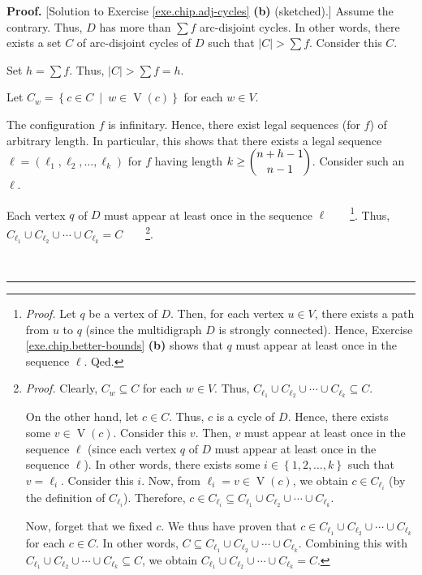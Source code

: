 \documentclass[numbers=enddot,12pt,final,onecolumn,notitlepage]{scrartcl}%
\theoremstyle{definition}
\newenvironment{proof}[1][Proof]{\noindent\textbf{#1.} }{\ \rule{0.5em}{0.5em}}
\let\sumnonlimits\sum
\renewcommand{\sum}{\sumnonlimits\limits}
\begin{document}
\begin{proof}
[Solution to Exercise \ref{exe.chip.adj-cycles} \textbf{(b)} (sketched).]
Assume the contrary. Thus, $D$ has more than $\sum f$ arc-disjoint cycles. In
other words, there exists a set $C$ of arc-disjoint cycles of $D$ such that
$\left\vert C\right\vert >\sum f$. Consider this $C$.

Set $h=\sum f$. Thus, $\left\vert C\right\vert >\sum f=h$.

Let $C_{w}=\left\{  c\in C\ \mid\ w\in\operatorname*{V}\left(  c\right)
\right\}  $ for each $w\in V$.

The configuration $f$ is infinitary. Hence, there exist legal sequences (for
$f$) of arbitrary length. In particular, this shows that there exists a legal
sequence $\ell=\left(  \ell_{1},\ell_{2},\ldots,\ell_{k}\right)  $ for $f$
having length $k\geq\dbinom{n+h-1}{n-1}$. Consider such an $\ell$.

Each vertex $q$ of $D$ must appear  at least once in the sequence $\ell
$\ \ \ \ \footnote{\textit{Proof.} Let $q$ be a vertex of $D$. Then, for each
vertex $u\in V$, there exists a path from $u$ to $q$ (since the multidigraph
$D$ is strongly connected). Hence, Exercise \ref{exe.chip.better-bounds}
\textbf{(b)} shows that $q$ must appear at least once in the sequence $\ell$.
Qed.}. Thus, $C_{\ell_{1}}\cup C_{\ell_{2}}\cup\cdots\cup C_{\ell_{k}}%
=C$\ \ \ \ \footnote{\textit{Proof.} Clearly, $C_{w}\subseteq C$ for each
$w\in V$. Thus, $C_{\ell_{1}}\cup C_{\ell_{2}}\cup\cdots\cup C_{\ell_{k}%
}\subseteq C$.
\par
On the other hand, let $c\in C$. Thus, $c$ is a cycle of $D$. Hence, there
exists some $v\in\operatorname*{V}\left(  c\right)  $. Consider this $v$.
Then, $v$ must appear at least once in the sequence $\ell$ (since each vertex
$q$ of $D$ must appear at least once in the sequence $\ell$). In other words,
there exists some $i\in\left\{  1,2,\ldots,k\right\}  $ such that $v=\ell_{i}%
$. Consider this $i$. Now, from $\ell_{i}=v\in\operatorname*{V}\left(
c\right)  $, we obtain $c\in C_{\ell_{i}}$ (by the definition of $C_{\ell_{i}%
}$). Therefore, $c\in C_{\ell_{i}}\subseteq C_{\ell_{1}}\cup C_{\ell_{2}}%
\cup\cdots\cup C_{\ell_{k}}$.
\par
Now, forget that we fixed $c$. We thus have proven that $c\in C_{\ell_{1}}\cup
C_{\ell_{2}}\cup\cdots\cup C_{\ell_{k}}$ for each $c\in C$. In other words,
$C\subseteq C_{\ell_{1}}\cup C_{\ell_{2}}\cup\cdots\cup C_{\ell_{k}}$.
Combining this with $C_{\ell_{1}}\cup C_{\ell_{2}}\cup\cdots\cup C_{\ell_{k}%
}\subseteq C$, we obtain $C_{\ell_{1}}\cup C_{\ell_{2}}\cup\cdots\cup
C_{\ell_{k}}=C$.}.


\end{proof}
\end{document}
